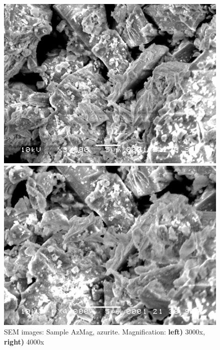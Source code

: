 \begin{figure}[H]
\centering
\begin{minipage}{.45\textwidth}
  \centering
  \includegraphics[width=\linewidth]{AzMag_x3000_1_160321}
\end{minipage}
\begin{minipage}{.45\textwidth}
  \centering
  \includegraphics[width=\linewidth]{AzMag_x4000_1_160321}
\end{minipage}
\caption[SEM images: Sample AzMag, azurite]{SEM images: Sample AzMag, azurite. Magnification: \textbf{left)} 3000x, \textbf{right)} 4000x}
\label{fig:azmag_sem_5}
\end{figure}



